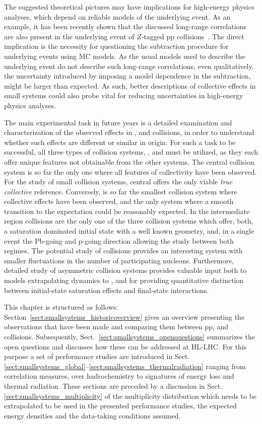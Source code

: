 \documentclass[../report.tex]{subfiles}
\begin{document}
The suggested theoretical pictures may have implications for high-energy physics analyses, which depend on reliable models of the underlying event. As an example, it has been recently shown that the discussed long-range correlations are also present in the underlying event of $Z$-tagged pp collisions~\cite{ATLAS:2017nkt}. The direct implication is the necessity for questioning the subtraction procedure for underlying events using MC models. As the usual models used to describe the underlying event do not describe such long-range correlations, even qualitatively, the uncertainty introduced by imposing a model dependence in the subtraction, might be larger than expected. As such, better descriptions of collective effects in small systems could also probe vital for reducing uncertainties in high-energy physics analyses.

The main experimental task in future years is a detailed examination and characterization of the observed effects in \pp, \pPb and \PbPb collisions, in order to understand whether such effects are different or similar in origin. For such a task to be successful, all three types of collision systems, \pp, \pPb and \PbPb must be utilized, as they each offer unique features not obtainable from the other systems. The central \PbPb collision system is so far the only one where all features of collectivity have been observed. For the study of small collision systems, central \PbPb offers the only viable \emph{true collective} reference. Conversely, \pp is so far the smallest collision system where collective effects have been observed, and the only system where a smooth transition to the \Pepem expectation could be reasonably expected. In the intermediate region \pPb collisions are the only one of the three collision systems which offer, both, a saturation dominated initial state with a well known geometry, and, in a single event the Pb-going and p-going direction allowing the study between both regimes.
The potential study of \OO collisions provides an interesting system with smaller fluctuations in the number of participating nucleons.
Furthermore, detailed study of asymmetric collision systems provides valuable input both to models extrapolating \pp dynamics to \PbPb, and for providing quantitative distinction between initial-state saturation effects and final-state interactions.

This chapter is structured as follows: Section~\ref{sect:smallsystems_historicoverview} gives an overview presenting the observations that have been made and comparing them between pp, \pPb and \PbPb collisions. Subsequently, Sect.~\ref{sect:smallsystems_openquestions} summarizes the open questions and discusses how these can be addressed at HL-LHC. 
For this purpose a set of performance studies are introduced in Sect.\ref{sect:smallsystems_global}--\ref{sect:smallsystems_thermalradiation} ranging from correlation measures, over hadrochemistry to signatures of energy loss and thermal radiation. These sections are preceded by a discussion in Sect.\ref{sect:smallsystems_multiplicity} of the multiplicity distribution which needs to be extrapolated to be used in the presented performance studies, the expected energy densities and the data-taking conditions assumed.
\end{document}
